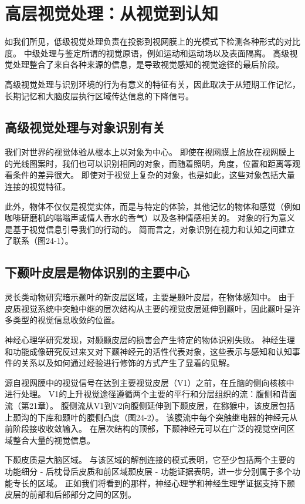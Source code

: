 \chapter{高层视觉处理：从视觉到认知} \label{chap:chap24}
如我们所见，低级视觉处理负责在投影到视网膜上的光模式下检测各种形式的对比度。 中级处理与鉴定所谓的视觉原语，例如运动和运动场以及表面隔离。 高级视觉处理整合了来自各种来源的信息，是导致视觉感知的视觉途径的最后阶段。

高级视觉处理与识别环境的行为有意义的特征有关，因此取决于从短期工作记忆，长期记忆和大脑皮层执行区域传达信息的下降信号。

\section{高级视觉处理与对象识别有关}
我们对世界的视觉体验从根本上以对象为中心。 即使在视网膜上施放在视网膜上的光线图案时，我们也可以识别相同的对象，而随着照明，角度，位置和距离等观看条件的差异很大。 即使对于视觉上复杂的对象，也是如此，这些对象包括大量连接的视觉特征。

此外，物体不仅仅是视觉实体，而是与特定的体验，其他记忆的物体和感觉（例如咖啡研磨机的嗡嗡声或情人香水的香气）以及各种情感相关的。 对象的行为意义是基于视觉信息引导我们的行动的。 简而言之，对象识别在视力和认知之间建立了联系（图24-1）。


\section{下颞叶皮层是物体识别的主要中心}

灵长类动物研究暗示颞叶的新皮层区域，主要是颞叶皮层，在物体感知中。 由于皮质视觉系统中突触中继的层次结构从主要的视觉皮层延伸到颞叶，因此颞叶是许多类型的视觉信息收敛的位置。

神经心理学研究发现，对颞颞皮层的损害会产生特定的物体识别失败。 神经生理和功能成像研究反过来又对下颞神经元的活性代表对象，这些表示与感知和认知事件的关系以及如何通过经验进行修饰的方式产生了显着的见解。

源自视网膜中的视觉信号在达到主要视觉皮层（V1）之前，在丘脑的侧向核核中进行处理。 V1的上升视觉途径遵循两个主要的平行和分层组织的流：腹侧和背面流（第21章）。 腹侧流从V1到V2向腹侧延伸到下颞皮层，在猕猴中，该皮层包括上颞沟的下库和颞叶的腹侧凸度（图24-2）。 该腹流中每个突触继电器的神经元从前阶段接收收敛输入。 在层次结构的顶部，下颞神经元可以在广泛的视觉空间区域整合大量的视觉信息。

下颞皮质是大脑区域。 与该区域的解剖连接的模式表明，它至少包括两个主要的功能细分 - 后枕骨后皮质和前区域颞皮层 - 功能证据表明，进一步分别属于多个功能专长的区域。 正如我们将看到的那样，神经心理学和神经生理学证据支持下颞皮层的前部和后部部分之间的区别。

